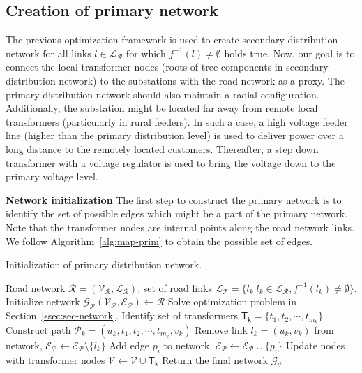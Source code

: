 \documentclass[sigconf]{acmart}
\begin{document}
\subsection{Creation of primary network}\label{ssec:primary}
The previous optimization framework is used to create secondary distribution network for all links $l\in\mathcal{L_R}$ for which $f^{-1}(l)\neq\emptyset$ holds true. Now, our goal is to connect the local transformer nodes (roots of tree components in secondary distribution network) to the substations with the road network as a proxy. The primary distribution network should also maintain a radial configuration. Additionally, the substation might be located far away from remote local transformers (particularly in rural feeders). In such a case, a high voltage feeder line (higher than the primary distribution level) is used to deliver power over a long distance to the remotely located customers. Thereafter, a step down transformer with a voltage regulator is used to bring the voltage down to the primary voltage level.

\noindent\textbf{Network initialization}
The first step to construct the primary network is to identify the set of possible edges which might be a part of the primary network. Note that the transformer nodes are internal points along the road network links. We follow Algorithm~\ref{alg:map-prim} to obtain the possible set of edges. 
\begin{algorithm}
	\caption{Initialization of primary distribution network.}
	\label{alg:map-prim}
	\begin{algorithmic}[1]
		\REQUIRE Road network $\mathcal{R}=(\mathcal{V_R},\mathcal{L_R})$, set of road links $\mathcal{L_T}=\big\{l_k\big|l_k\in\mathcal{L_R},f^{-1}(l_k)\neq\emptyset\big\}$.
		\STATE Initialize network $\mathcal{G_P}(\mathcal{V_P},\mathcal{E_P})\leftarrow\mathcal{R}$
		\STATE Solve optimization problem in Section~\ref{ssec:sec-network}.
		\STATE Identify set of transformers $\mathsf{T_k}=\{t_{1},t_{2},\cdots,t_{m_k}\}$
		\STATE Construct path $\mathcal{P}_k=(u_k,t_{1},t_{2},\cdots,t_{m_k},v_k)$
		\STATE Remove link $l_k=(u_k,v_k)$ from network, $\mathcal{E_P}\leftarrow\mathcal{E_P}\setminus\{l_k\}$
		\STATE Add edge $p_i$ to network, $\mathcal{E_P}\leftarrow\mathcal{E_P}\cup \{p_i\}$
		\ENDFOR
		\STATE Update nodes with transformer nodes $\mathcal{V}\leftarrow\mathcal{V}\cup\mathsf{T_k}$
		\ENDFOR
		\STATE Return the final network $\mathcal{G_P}$
	\end{algorithmic}
\end{algorithm}
\end{document}
